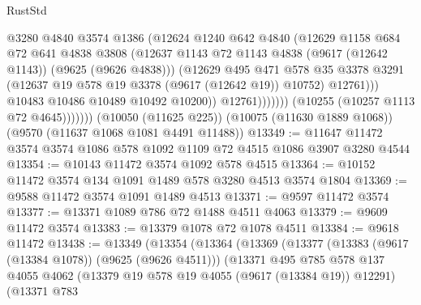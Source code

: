 \begin{lexlean}{RustStd}
\begin{coremodule}
                                @3280
                                @4840
                                @3574
                                @1386
                                (@12624
                                  @1240
                                  @642
                                  @4840
                                  (@12629
                                    @1158
                                    @684
                                    @72
                                    @641
                                    @4838
                                    @3808
                                    (@12637
                                      @1143
                                      @72
                                      @1143
                                      @4838
                                      (@9617 (@12642 @1143))
                                      (@9625 (@9626 @4838)))
                                    (@12629
                                      @495
                                      @471
                                      @578
                                      @35
                                      @3378
                                      @3291
                                      (@12637 @19 @578 @19 @3378 (@9617 (@12642 @19)) @10752)
                                      @12761)))
                                @10483
                                @10486
                                @10489
                                @10492
                                @10200))
                            @12761)))))))
              (@10255 (@10257 @1113 @72 @4645)))))))
    (@10050 (@11625 @225))
    (@10075 (@11630 @1889 @1068))
    (@9570 (@11637 @1068 @1081 @4491 @11488))
@13349 := @11647 @11472 @3574 @3574 @1086 @578 @1092 @1109 @72 @4515 @1086 @3907 @3280 @4544
@13354 := @10143 @11472 @3574 @1092 @578 @4515
@13364 := @10152 @11472 @3574 @134 @1091 @1489 @578 @3280 @4513 @3574 @1804
@13369 := @9588 @11472 @3574 @1091 @1489 @4513
@13371 := @9597 @11472 @3574
@13377 := @13371 @1089 @786 @72 @1488 @4511 @4063
@13379 := @9609 @11472 @3574
@13383 := @13379 @1078 @72 @1078 @4511
@13384 := @9618 @11472
@13438 := @13349
    (@13354
      (@13364
        (@13369
          (@13377
            (@13383 (@9617 (@13384 @1078)) (@9625 (@9626 @4511)))
            (@13371
              @495
              @785
              @578
              @137
              @4055
              @4062
              (@13379 @19 @578 @19 @4055 (@9617 (@13384 @19)) @12291)
              (@13371
                @783

\end{coremodule}
\end{lexlean}
